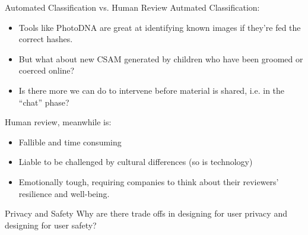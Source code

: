\documentclass[nobackground,dvipsnames,table,aspectratio=169]{beamer}
\begin{document}
\begin{frame}{Automated Classification vs. Human Review}
    Autmated Classification:
    \begin{itemize}
        \item Tools like PhotoDNA are great at identifying known images if they’re fed the correct hashes.
        \item But what about new CSAM generated by children who have been groomed or coerced online?
        \item Is there more we can do to intervene before material is shared, i.e. in the “chat” phase?
    \end{itemize}
    Human review, meanwhile is:
    \begin{itemize}
        \item Fallible and time consuming
        \item Liable to be challenged by cultural differences (so is technology)
        \item Emotionally tough, requiring companies to think about their reviewers’ resilience and well-being.
    \end{itemize}
\end{frame}

\begin{frame}{Privacy and Safety}
    Why are there trade offs in designing for user privacy and designing for user safety?
\end{frame}
\end{document}
